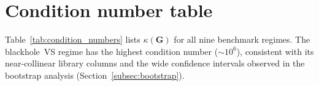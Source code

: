 \begin{table}[H]
\centering\footnotesize
\caption{LSTM hyperparameters (final configuration).}
\label{tab:lstm_config}
\end{table}

\section{Condition number table}
\label{sec:appG_condition}

Table~\ref{tab:condition_numbers} lists $\kappa(\mathbf{G})$ for all nine
benchmark regimes.  The blackhole~VS regime has the highest condition
number ($\sim\!10^6$), consistent with its near-collinear library columns
and the wide confidence intervals observed in the bootstrap analysis
(Section~\ref{subsec:bootstrap}).

